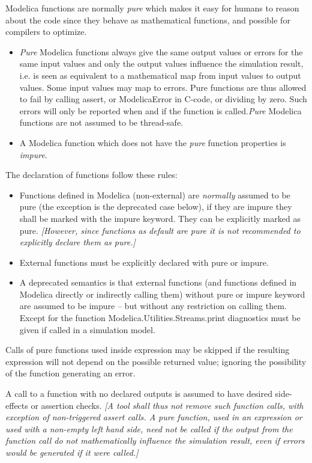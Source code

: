 Modelica functions are normally \emph{pure} which makes it easy for
humans to reason about the code since they behave as mathematical
functions, and possible for compilers to optimize.

\begin{itemize}
\item
  \emph{Pure} Modelica functions always give the same output values or
  errors for the same input values and only the output values influence
  the simulation result, i.e. is seen as equivalent to a mathematical
  map from input values to output values. Some input values may map to
  errors. Pure functions are thus allowed to fail by calling assert, or
  ModelicaError in C-code, or dividing by zero. Such errors will only be
  reported when and if the function is called.\emph{Pure} Modelica
  functions are not assumed to be thread-safe.
\item
  A Modelica function which does not have the \emph{pure} function
  properties is \emph{impure}.
\end{itemize}

The declaration of functions follow these rules:

\begin{itemize}
\item
  Functions defined in Modelica (non-external) are \emph{normally}
  assumed to be pure (the exception is the deprecated case below), if
  they are impure they shall be marked with the impure keyword. They can
  be explicitly marked as pure. \emph{{[}However, since functions as
  default are pure it is not recommended to explicitly declare them as
  pure.{]}}
\item
  External functions must be explicitly declared with pure or impure.
\item
  A deprecated semantics is that external functions (and functions
  defined in Modelica directly or indirectly calling them) without pure
  or impure keyword are assumed to be impure -- but without any
  restriction on calling them. Except for the function
  Modelica.Utilities.Streams.print diagnostics must be given if called
  in a simulation model.
\end{itemize}

Calls of pure functions used inside expression may be skipped if the
resulting expression will not depend on the possible returned value;
ignoring the possibility of the function generating an error.

A call to a function with no declared outputs is assumed to have desired
side-effects or assertion checks. \emph{{[}A tool shall thus not remove
such function calls, with exception of non-triggered assert calls. A
pure function, used in an expression or used with a non-empty left hand
side, need not be called if the output from the function call do not
mathematically influence the simulation result, even if errors would be
generated if it were called.{]}}


